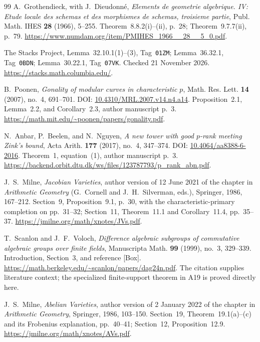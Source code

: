 \begin{thebibliography}{99}
A.~Grothendieck, with J.~Dieudonn\'e, \emph{Elements de geometrie
algebrique. IV: Etude locale des schemas et des morphismes de
schemas, troisieme partie}, Publ. Math. IHES \textbf{28} (1966),
5--255. Theorem~8.8.2(i)--(ii), p.~28; Theorem~9.7.7(ii), p.~79.
\url{https://www.numdam.org/item/PMIHES_1966__28__5_0.pdf}.

The Stacks Project, Lemma~32.10.1(1)--(3), Tag~\texttt{01ZM};
Lemma~36.32.1, Tag~\texttt{0BDN}; Lemma~30.22.1,
Tag~\texttt{07VK}. Checked 21 November 2026.
\url{https://stacks.math.columbia.edu/}.

B.~Poonen,
\emph{Gonality of modular curves in characteristic $p$},
Math. Res. Lett. \textbf{14} (2007), no.~4, 691--701.
DOI: \href{https://doi.org/10.4310/MRL.2007.v14.n4.a14}{10.4310/MRL.2007.v14.n4.a14}.
Proposition~2.1, Lemma~2.2, and Corollary~2.3, author manuscript p.~3.
\url{https://math.mit.edu/~poonen/papers/gonality.pdf}.

N.~Anbar, P.~Beelen, and N.~Nguyen,
\emph{A new tower with good $p$-rank meeting Zink's bound},
Acta Arith. \textbf{177} (2017), no.~4, 347--374.
DOI: \href{https://doi.org/10.4064/aa8388-6-2016}{10.4064/aa8388-6-2016}.
Theorem~1, equation~(1), author manuscript p.~3.
\url{https://backend.orbit.dtu.dk/ws/files/123787793/p_rank_abn.pdf}.

J.~S.~Milne, \emph{Jacobian Varieties}, author version of
12 June 2021 of the chapter in \emph{Arithmetic Geometry}
(G.~Cornell and J.~H.~Silverman, eds.), Springer, 1986, 167--212.
Section~9, Proposition~9.1, p.~30, with the characteristic-primary
completion on pp.~31--32; Section~11, Theorem~11.1 and
Corollary~11.4, pp.~35--37.
\url{https://jmilne.org/math/xnotes/JVs.pdf}.

T.~Scanlon and J.~F.~Voloch,
\emph{Difference algebraic subgroups of commutative algebraic
groups over finite fields},
Manuscripta Math. \textbf{99} (1999), no.~3, 329--339.
Introduction, Section~3, and reference \textnormal{[Box]}.
\url{https://math.berkeley.edu/~scanlon/papers/dag24n.pdf}.
The citation supplies literature context; the specialized
finite-support theorem in A19 is proved directly here.


J.~S.~Milne, \emph{Abelian Varieties}, author version of
2 January 2022 of the chapter in \emph{Arithmetic Geometry},
Springer, 1986, 103--150.
Section~19, Theorem~19.1(a)--(c) and its Frobenius explanation,
pp.~40--41; Section~12, Proposition~12.9.
\url{https://jmilne.org/math/xnotes/AVs.pdf}.



\end{thebibliography}
